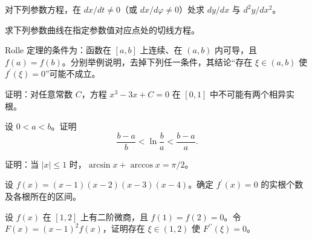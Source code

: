 \noindent\begin{minipage}{\textwidth}
对下列参数方程，在 $dx/dt\ne0$（或 $dx/d\varphi\ne0$）处求 $dy/dx$ 与 $d^2y/dx^2$。
\end{minipage}\par\vfill
\noindent\begin{minipage}{\textwidth}
求下列参数曲线在指定参数值对应点处的切线方程。
\end{minipage}\par\vfill
\newpage
\noindent\begin{minipage}{\textwidth}
Rolle 定理的条件为：函数在 $[a,b]$ 上连续、在 $(a,b)$ 内可导，且 $f(a)=f(b)$。分别举例说明，去掉下列任一条件，其结论“存在 $\xi\in(a,b)$ 使 $f^{\prime}(\xi)=0$”可能不成立。
\end{minipage}\par\vfill
\noindent\begin{minipage}{\textwidth}
证明：对任意常数 $C$，方程 $x^3-3x+C=0$ 在 $[0,1]$ 中不可能有两个相异实根。
\end{minipage}\par\vfill
\noindent\begin{minipage}{\textwidth}
设 $0<a<b$。证明\[\frac{b-a}{b}<\ln\frac ba<\frac{b-a}{a}.\]
\end{minipage}\par\vfill
\noindent\begin{minipage}{\textwidth}
证明：当 $|x|\le1$ 时，$\arcsin x+\arccos x=\pi/2$。
\end{minipage}\par\vfill
\newpage
\noindent\begin{minipage}{\textwidth}
设 $f(x)=(x-1)(x-2)(x-3)(x-4)$。确定 $f^{\prime}(x)=0$ 的实根个数及各根所在的区间。
\end{minipage}\par\vfill
\noindent\begin{minipage}{\textwidth}
设 $f(x)$ 在 $[1,2]$ 上有二阶微商，且 $f(1)=f(2)=0$。令 $F(x)=(x-1)^2f(x)$，证明存在 $\xi\in(1,2)$ 使 $F^{\prime\prime}(\xi)=0$。
\end{minipage}\par\vfill
